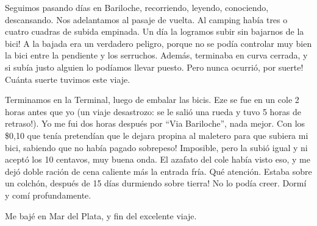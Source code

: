 Seguimos pasando d\'ias en Bariloche, recorriendo, leyendo, conociendo,
descansando. Nos adelantamos al pasaje de vuelta. Al camping hab\'ia tres o
cuatro cuadras de subida empinada. \textexclamdown Un d\'ia la logramos subir
sin bajarnos de la bici! A la bajada era un verdadero peligro, porque no se
pod\'ia controlar muy bien la bici entre la pendiente y los serruchos. Adem\'as,
terminaba en curva cerrada, y si sub\'ia justo alguien lo pod\'iamos llevar
puesto. \textexclamdown Pero nunca ocurri\'o, por suerte! Cu\'anta suerte
tuvimos este viaje.

Terminamos en la Terminal, luego de embalar las bicis. Eze se fue en un cole 2
horas antes que yo (un viaje desastrozo: \textexclamdown se le sali\'o una rueda
y tuvo 5 horas de retraso!). Yo me fui dos horas despu\'es por ``Via
Bariloche'', nada mejor. \textexclamdown Con los \$0,10 que ten\'ia pretend\'ian
que le dejara propina al maletero para que subiera mi bici, sabiendo que no
hab\'ia pagado sobrepeso! Imposible, pero la subi\'o igual y ni acept\'o los 10
centavos, muy buena onda. El azafato del cole hab\'ia visto eso, y me dej\'o
doble raci\'on de cena caliente m\'as la entrada fr\'ia. Qu\'e atenci\'on.
\textexclamdown Estaba sobre un colch\'on, despu\'es de 15 d\'ias durmiendo
sobre tierra! No lo pod\'ia creer. Dorm\'i y com\'i profundamente.

Me baj\'e en Mar del Plata, y fin del excelente viaje.
